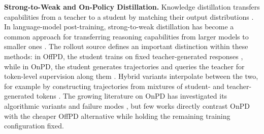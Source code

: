 \documentclass{article} %
\theoremstyle{plain}
\theoremstyle{definition}
\theoremstyle{remark}
\begin{document}
\textbf{Strong-to-Weak and On-Policy Distillation.} Knowledge distillation transfers capabilities from a teacher to a student by matching their output distributions \citep{hinton_distilling_2015, kim-rush-2016-sequence}. In language-model post-training, strong-to-weak distillation has become a common approach for transferring reasoning capabilities from larger models to smaller ones \citep{abdin2024phi3technicalreporthighly, team_mimo-v2-flash_2026, team2025qwen3, deepseekai2026deepseekv4highlyefficientmilliontoken, team2026kimik3}. The rollout source defines an important distinction within these methods: in OffPD, the student trains on fixed teacher-generated responses \citep{sanh2020distilbertdistilledversionbert}, while in OnPD, the student generates trajectories and queries the teacher for token-level supervision along them \citep{agarwal_-policy_2024}. Hybrid variants interpolate between the two, for example by constructing trajectories from mixtures of student- and teacher-generated tokens \citep{xu_speculative_2025}. The growing literature on OnPD has investigated its algorithmic variants and failure modes \citep{song2026surveyonpolicydistillationlarge, li_rethinking_2026, armandpour_unmasking_2026, jia_asymmetric_2026, li_filter_2026, zhu2026facesonpolicydistillationpitfalls}, but few works directly contrast OnPD with the cheaper OffPD alternative while holding the remaining training configuration fixed.
\end{document}

